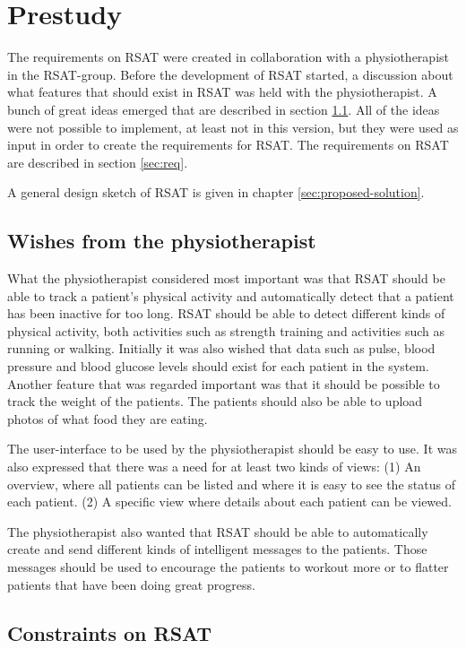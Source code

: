\documentclass{cslthse-msc}
\begin{document}
\chapter{Prestudy}

The requirements on RSAT were created in collaboration with a physiotherapist in the RSAT-group. Before the development of RSAT started, a discussion about what features that should exist in RSAT was held with the physiotherapist. A bunch of great ideas emerged that are described in section \ref{sec:wishes}. All of the ideas were not possible to implement, at least not in this version, but they were used as input in order to create the requirements for RSAT. The requirements on RSAT are described in section \ref{sec:req}.

A general design sketch of RSAT is given in chapter \ref{sec:proposed-solution}.


\section{Wishes from the physiotherapist}
\label{sec:wishes}

What the physiotherapist considered most important was that RSAT should be able to track a patient’s physical activity and automatically detect that a patient has been inactive for too long. RSAT should be able to detect different kinds of physical activity, both activities such as strength training and activities such as running or walking. Initially it was also wished that data such as pulse, blood pressure and blood glucose levels should exist for each patient in the system. Another feature that was regarded important was that it should be possible to track the weight of the patients. The patients should also be able to upload photos of what food they are eating.

The user-interface to be used by the physiotherapist should be easy to use. It was also expressed that there was a need for at least two kinds of views: (1) An overview, where all patients can be listed and where it is easy to see the status of each patient. (2) A specific view where details about each patient can be viewed.

The physiotherapist also wanted that RSAT should be able to automatically create and send different kinds of intelligent messages to the patients. Those messages should be used to encourage the patients to workout more or to flatter patients that have been doing great progress. 


\section{Constraints on RSAT}
\end{document}

